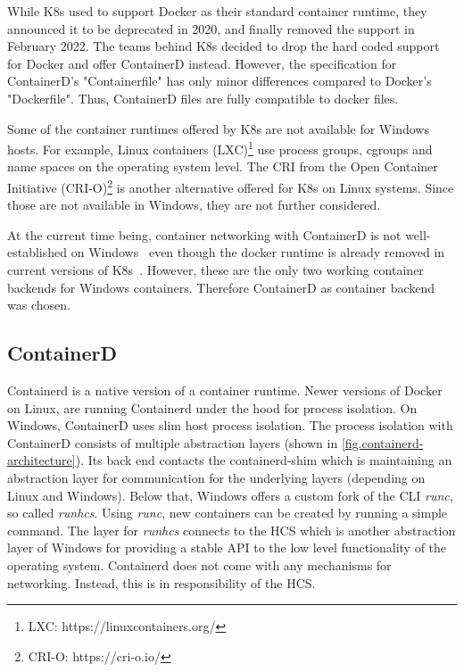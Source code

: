 While \ac{K8s} used to support Docker as their standard container runtime, they announced it to be deprecated in 2020, and finally removed the support in February 2022\cite{Kubernetes.2020, Kubernetes.2022}. The teams behind \ac{K8s} decided to drop the hard coded support for Docker and offer ContainerD instead.
However, the specification for ContainerD's "Containerfile" has only minor differences compared to Docker's "Dockerfile". Thus, ContainerD files are fully compatible to docker files.

Some of the container runtimes offered by \ac{K8s} are not available for \ac{Windows} hosts. For example, Linux containers (LXC)\footnote{LXC: https://linuxcontainers.org/} use process groups, \acp{cgroup} and name spaces on the operating system level.
The \ac{CRI} from the Open Container Initiative (CRI-O)\footnote{CRI-O: https://cri-o.io/} is another alternative offered for \ac{K8s} on Linux systems. Since those are not available in \ac{Windows}, they are not further considered.

At the current time being, container networking with ContainerD is not well-established on \ac{Windows}~\cite{GitHub.20230202,GitHub.20230202b,Github.2022_258,GitHub.20230202c} even though the docker runtime is already removed in current versions of \ac{K8s}~\cite{Kubernetes.2020}. However, these are the only two working container backends for \ac{Windows} containers. Therefore ContainerD as container backend was chosen.

\subsection{ContainerD}
Containerd is a native version of a container runtime. Newer versions of Docker on Linux, are running Containerd under the hood for process isolation. On \ac{Windows}, ContainerD uses slim host process isolation.  The process isolation with ContainerD consists of multiple abstraction layers (shown in \autoref{fig.containerd-architecture}). Its back end contacts the containerd-shim which is maintaining an abstraction layer for communication for the underlying layers (depending on Linux and \ac{Windows}). Below that, \ac{Windows} offers a custom fork of the \ac{CLI} \textit{runc}, so called \textit{runhcs}\cite{Scooley.2022}. Using \textit{runc}, new containers can be created by running a simple command\cite{Scooley.2022}. The layer for \textit{runhcs} connects to the \ac{HCS} which is another abstraction layer of \ac{Windows} for providing a stable \ac{API} to the low level functionality of the operating system\cite{Microsoft.2017}. Containerd does not come with any mechanisms for networking. Instead, this is in responsibility of the \ac{HCS}.

